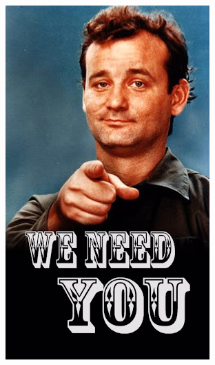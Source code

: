 \documentclass[aspectratio=169,dvipsnames,svgnames,10pt]{beamer}
\begin{document}
\begin{frame}
\begin{columns}
    \includegraphics[width=\textwidth]{weneedyou.jpg}
    
  \end{columns}
  
\end{frame}
\end{document}
